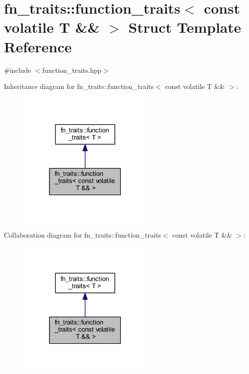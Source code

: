 \hypertarget{structfn__traits_1_1function__traits_3_01const_01volatile_01_t_01_6_6_01_4}{}\section{fn\+\_\+traits\+:\+:function\+\_\+traits$<$ const volatile T \&\& $>$ Struct Template Reference}
\label{structfn__traits_1_1function__traits_3_01const_01volatile_01_t_01_6_6_01_4}


{\ttfamily \#include $<$function\+\_\+traits.\+hpp$>$}



Inheritance diagram for fn\+\_\+traits\+:\+:function\+\_\+traits$<$ const volatile T \&\& $>$\+:\nopagebreak
\begin{figure}[H]
\begin{center}
\leavevmode
\includegraphics[width=189pt]{d9/dea/structfn__traits_1_1function__traits_3_01const_01volatile_01_t_01_6_6_01_4__inherit__graph}
\end{center}
\end{figure}


Collaboration diagram for fn\+\_\+traits\+:\+:function\+\_\+traits$<$ const volatile T \&\& $>$\+:\nopagebreak
\begin{figure}[H]
\begin{center}
\leavevmode
\includegraphics[width=189pt]{d3/de4/structfn__traits_1_1function__traits_3_01const_01volatile_01_t_01_6_6_01_4__coll__graph}
\end{center}
\end{figure}


